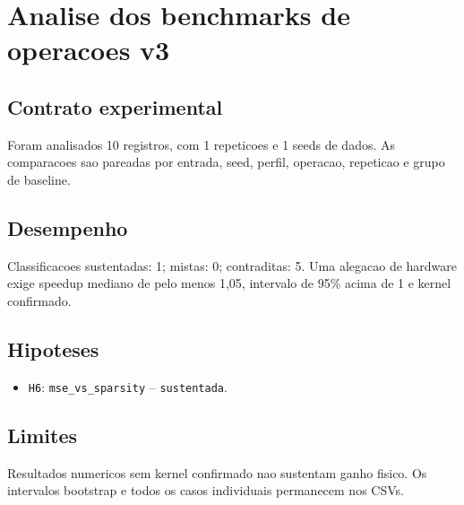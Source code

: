 \chapter{Analise dos benchmarks de operacoes v3}
\section{Contrato experimental}
Foram analisados 10 registros, com 1 repeticoes e 1 seeds de dados.
As comparacoes sao pareadas por entrada, seed, perfil, operacao, repeticao e grupo de baseline.
\section{Desempenho}
Classificacoes sustentadas: 1; mistas: 0; contraditas: 5.
Uma alegacao de hardware exige speedup mediano de pelo menos 1,05, intervalo de 95\% acima de 1 e kernel confirmado.
\section{Hipoteses}
\begin{itemize}
\item \texttt{H6}: \texttt{mse\_vs\_sparsity} -- \texttt{sustentada}.
\end{itemize}
\section{Limites}
Resultados numericos sem kernel confirmado nao sustentam ganho fisico. Os intervalos bootstrap e todos os casos individuais permanecem nos CSVs.
